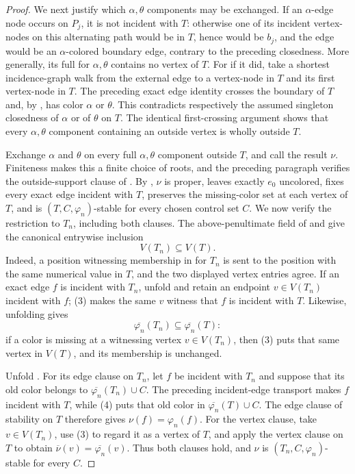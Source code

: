 \begin{proof}
We next justify which $\alpha,\theta$ components may be exchanged.  If an
$\alpha$-edge node occurs on $P_j$, it is not incident with $T$:
otherwise one of its incident vertex-nodes on this alternating path
would be in $T$, hence would be $b_j$, and the edge would be an
$\alpha$-colored boundary edge, contrary to the preceding closedness.
More generally, its full  for
$\alpha,\theta$ contains no vertex of $T$.  For if it did, take a
shortest incidence-graph walk from the external edge to a vertex-node in
$T$ and its first vertex-node in $T$.  The preceding exact edge identity
crosses the boundary of $T$ and, by
, has color $\alpha$ or $\theta$.
This contradicts respectively the assumed singleton closedness of
$\alpha$ or of $\theta$ on $T$.  The identical first-crossing argument
shows that every $\alpha,\theta$ component containing an outside vertex
is wholly outside $T$.

Exchange $\alpha$ and $\theta$ on every full $\alpha,\theta$ component
outside $T$, and call the result $\nu$.  Finiteness makes this a finite
choice of roots, and the preceding paragraph verifies the outside-support
clause of .  By
, $\nu$ is proper, leaves exactly
$e_0$ uncolored, fixes every exact edge incident with $T$, preserves the
missing-color set at each vertex of $T$, and is
$(T,C,\varphi_n)$-stable for every chosen control set $C$.  We now verify
the restriction to $T_n$, including both clauses.  The
above-penultimate field of  and
 give the canonical entrywise
inclusion
\[
                         V(T_n)\subseteq V(T).                  \tag{3}
\]
Indeed, a position witnessing membership in
 for $T_n$ is sent to the position with the
same numerical value in $T$, and the two displayed vertex entries agree.
If an exact edge $f$ is incident with $T_n$, unfold
 and retain an endpoint $v\in V(T_n)$ incident
with $f$; (3) makes the same $v$ witness that $f$ is incident with $T$.
Likewise, unfolding  gives
\[
              \overline{\varphi_n}(T_n)
                    \subseteq\overline{\varphi_n}(T):          \tag{4}
\]
if a color is missing at a witnessing vertex $v\in V(T_n)$, then (3) puts
that same vertex in $V(T)$, and its  membership is
unchanged.

Unfold .  For its edge clause on $T_n$, let $f$
be incident with $T_n$ and suppose that its old color belongs to
$\overline{\varphi_n}(T_n)\cup C$.  The preceding incident-edge transport
makes $f$ incident with $T$, while (4) puts that old color in
$\overline{\varphi_n}(T)\cup C$.  The edge clause of stability on $T$
therefore gives $\nu(f)=\varphi_n(f)$.  For the vertex clause, take
$v\in V(T_n)$, use (3) to regard it as a vertex of $T$, and apply the
vertex clause on $T$ to obtain
$\overline\nu(v)=\overline{\varphi_n}(v)$.  Thus both clauses hold, and
$\nu$ is $(T_n,C,\varphi_n)$-stable for every $C$.


\end{proof}
